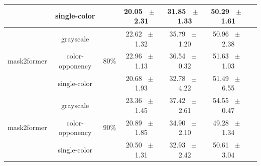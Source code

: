 \begin{table}[h]
\begin{tabular}{@{}lccc ccc@{}}
    & single-color & & 20.05 ~$\pm$~ 2.31 & 31.85 ~$\pm$~ 1.33 & 50.29 ~$\pm$~ 1.61 \\
    \midrule
    \multirow{3}{*}{mask2former} & grayscale & \multirow{3}{*}{80\%} & 22.62 ~$\pm$~ 1.32 & 35.79 ~$\pm$~ 1.20 & 50.96 ~$\pm$~ 2.38 \\
    & color-opponency & & 22.96 ~$\pm$~ 1.13 & 36.54 ~$\pm$~ 0.32 & 51.63 ~$\pm$~ 1.03 \\
    & single-color & & 20.68 ~$\pm$~ 1.93 & 32.78 ~$\pm$~ 4.22 & 51.49 ~$\pm$~ 6.55 \\
    \midrule
    \multirow{3}{*}{mask2former} & grayscale & \multirow{3}{*}{90\%} & 23.36 ~$\pm$~ 1.45 & 37.42 ~$\pm$~ 2.61 & 54.55 ~$\pm$~ 0.47 \\
    & color-opponency & & 20.89 ~$\pm$~ 1.85 & 34.90 ~$\pm$~ 2.10 & 49.28 ~$\pm$~ 1.34 \\
    & single-color & & 20.50 ~$\pm$~ 1.31 & 32.93 ~$\pm$~ 2.42 & 50.61 ~$\pm$~ 3.04 \\
    \midrule
    \bottomrule
  \end{tabular}
  \label{tab:sparse_mask2former_dark_zurich}
\end{table}